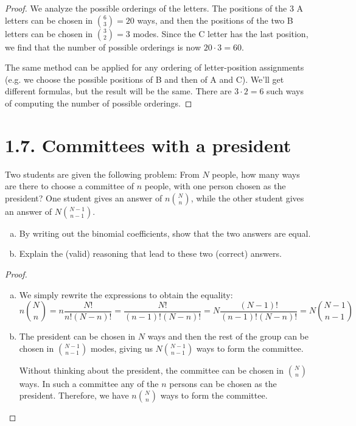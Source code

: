 \vspace{1em}

\begin{proof}
    We analyze the possible orderings of the letters. The positions of the 3 A letters can be chosen 
    in $\binom{6}{3} = 20$ ways, and then the positions of the two B letters can be chosen in
    $\binom{3}{2} = 3$ modes. Since the C letter has the last position, we find that the number of possible
    orderings is now $20 \cdot 3 = 60$.

    The same method can be applied for any ordering of letter-position assignments (e.g. we choose the 
    possible positions of B and then of A and C). We'll get different formulas, but the result will be the
    same. There are $3 \cdot 2 = 6$ such ways of computing the number of possible orderings.
\end{proof}

\section*{1.7. Committees with a president}
Two students are given the following problem: From $N$ people, how many ways are there to choose a committee
of $n$ people, with one person chosen as the president? One student gives an answer of $n\binom{N}{n}$, while
the other student gives an answer of $N\binom{N-1}{n-1}$.

\begin{enumerate}[(a)]
    \item By writing out the binomial coefficients, show that the two answers are equal.
    \item Explain the (valid) reasoning that lead to these two (correct) answers.
\end{enumerate}

\vspace{1em}

\begin{proof}
    \hfill
    \begin{enumerate}[(a)]
        \item We simply rewrite the expressions to obtain the equality:
        \[
            n\binom{N}{n} = n\frac{N!}{n!(N-n)!} = \frac{N!}{(n-1)!(N-n)!} = N\frac{(N-1)!}{(n-1)!(N-n)!}
                          = N\binom{N-1}{n-1}
        \]
        \item The president can be chosen in $N$ ways and then the rest of the group can be chosen in 
            $\binom{N-1}{n-1}$ modes, giving us $N\binom{N-1}{n-1}$ ways to form the committee.

            Without thinking about the president, the committee can be chosen in $\binom{N}{n}$ ways. In 
            such a committee any of the $n$ persons can be chosen as the president. Therefore, we have 
            $n\binom{N}{n}$ ways to form the committee.
    \end{enumerate}
\end{proof}

